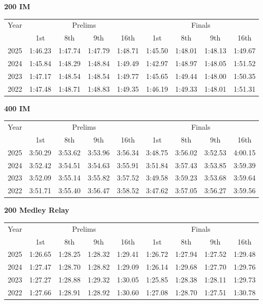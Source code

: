 \clearpage
\textbf{200 IM}

\begin{flushleft}
\begin{tabular}{|c|c|c|c|c|c|c|c|c|}
\hline
Year & \multicolumn{4}{c|}{Prelims} & \multicolumn{4}{c|}{Finals} \\
\cline{2-9}
& 1st & 8th & 9th & 16th & 1st & 8th & 9th & 16th \\
\hline
2025 & 1:46.23 & 1:47.74 & 1:47.79 & 1:48.71 & 1:45.50 & 1:48.01 & 1:48.13 & 1:49.67 \\
2024 & 1:45.84 & 1:48.29 & 1:48.84 & 1:49.49 & 1:42.97 & 1:48.97 & 1:48.05 & 1:51.52 \\
2023 & 1:47.17 & 1:48.54 & 1:48.54 & 1:49.77 & 1:45.65 & 1:49.44 & 1:48.00 & 1:50.35 \\
2022 & 1:47.48 & 1:48.71 & 1:48.83 & 1:49.35 & 1:46.19 & 1:49.33 & 1:48.01 & 1:51.31 \\
\hline
\end{tabular}
\end{flushleft}

\textbf{400 IM}

\begin{flushleft}
\begin{tabular}{|c|c|c|c|c|c|c|c|c|}
\hline
Year & \multicolumn{4}{c|}{Prelims} & \multicolumn{4}{c|}{Finals} \\
\cline{2-9}
& 1st & 8th & 9th & 16th & 1st & 8th & 9th & 16th \\
\hline
2025 & 3:50.29 & 3:53.62 & 3:53.96 & 3:56.34 & 3:48.75 & 3:56.02 & 3:52.53 & 4:00.15 \\
2024 & 3:52.42 & 3:54.51 & 3:54.63 & 3:55.91 & 3:51.84 & 3:57.43 & 3:53.85 & 3:59.39 \\
2023 & 3:52.09 & 3:55.14 & 3:55.82 & 3:57.52 & 3:49.58 & 3:59.23 & 3:53.68 & 3:59.64 \\
2022 & 3:51.71 & 3:55.40 & 3:56.47 & 3:58.52 & 3:47.62 & 3:57.05 & 3:56.27 & 3:59.56 \\
\hline
\end{tabular}
\end{flushleft}

\textbf{200 Medley Relay}

\begin{flushleft}
\begin{tabular}{|c|c|c|c|c|c|c|c|c|}
\hline
Year & \multicolumn{4}{c|}{Prelims} & \multicolumn{4}{c|}{Finals} \\
\cline{2-9}
& 1st & 8th & 9th & 16th & 1st & 8th & 9th & 16th \\
\hline
2025 & 1:26.65 & 1:28.25 & 1:28.32 & 1:29.41 & 1:26.72 & 1:27.94 & 1:27.52 & 1:29.48 \\
2024 & 1:27.47 & 1:28.70 & 1:28.82 & 1:29.09 & 1:26.14 & 1:29.68 & 1:27.70 & 1:29.76 \\
2023 &  1:27.27 & 1:28.88 & 1:29.32 & 1:30.05 & 1:25.85 & 1:28.38 & 1:28.11 & 1:29.73 \\
2022 & 1:27.66 & 1:28.91 & 1:28.92 & 1:30.60 & 1:27.08 & 1:28.70 & 1:27.51 & 1:30.78 \\
\hline
\end{tabular}
\end{flushleft}

